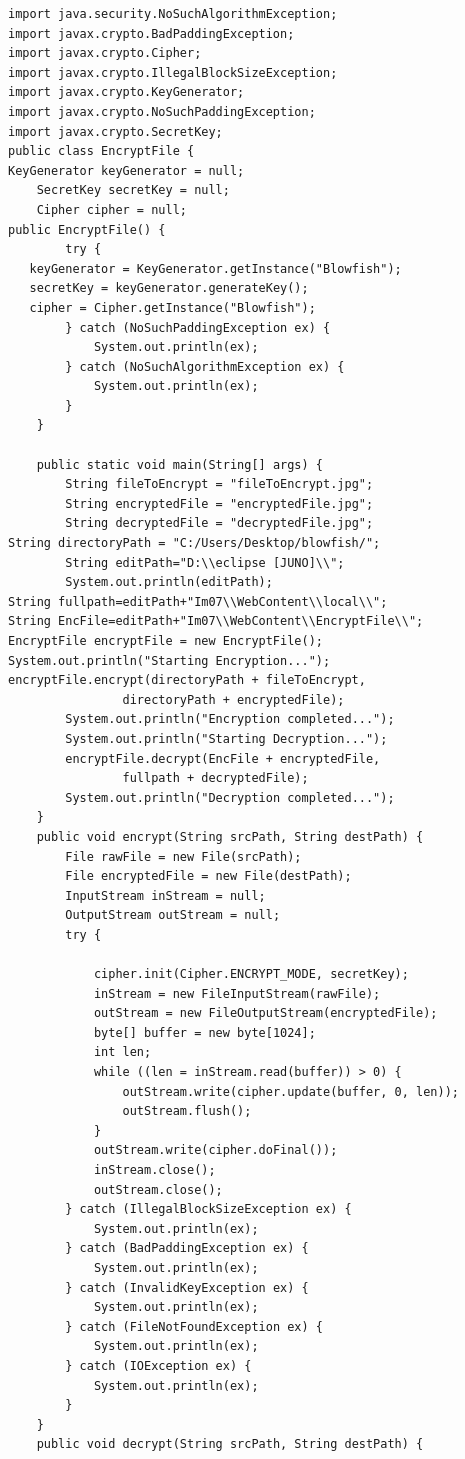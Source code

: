 \documentclass[BTech]{srmuthesis}
\begin{document}
\begin{verbatim}
import java.security.NoSuchAlgorithmException;
import javax.crypto.BadPaddingException;
import javax.crypto.Cipher;
import javax.crypto.IllegalBlockSizeException;
import javax.crypto.KeyGenerator;
import javax.crypto.NoSuchPaddingException;
import javax.crypto.SecretKey;
public class EncryptFile {
KeyGenerator keyGenerator = null;
    SecretKey secretKey = null;
    Cipher cipher = null;
public EncryptFile() {
        try {
   keyGenerator = KeyGenerator.getInstance("Blowfish");
   secretKey = keyGenerator.generateKey();
   cipher = Cipher.getInstance("Blowfish");
        } catch (NoSuchPaddingException ex) {
            System.out.println(ex);
        } catch (NoSuchAlgorithmException ex) {
            System.out.println(ex);
        }
    }

    public static void main(String[] args) {
        String fileToEncrypt = "fileToEncrypt.jpg";
        String encryptedFile = "encryptedFile.jpg";
        String decryptedFile = "decryptedFile.jpg";
String directoryPath = "C:/Users/Desktop/blowfish/";
        String editPath="D:\\eclipse [JUNO]\\";
		System.out.println(editPath);
String fullpath=editPath+"Im07\\WebContent\\local\\";
String EncFile=editPath+"Im07\\WebContent\\EncryptFile\\";
EncryptFile encryptFile = new EncryptFile();
System.out.println("Starting Encryption...");
encryptFile.encrypt(directoryPath + fileToEncrypt,
                directoryPath + encryptedFile);
        System.out.println("Encryption completed...");
        System.out.println("Starting Decryption...");
        encryptFile.decrypt(EncFile + encryptedFile,
        		fullpath + decryptedFile);
        System.out.println("Decryption completed...");
    }
    public void encrypt(String srcPath, String destPath) {
        File rawFile = new File(srcPath);
        File encryptedFile = new File(destPath);
        InputStream inStream = null;
        OutputStream outStream = null;
        try {
           
            cipher.init(Cipher.ENCRYPT_MODE, secretKey);
            inStream = new FileInputStream(rawFile);
            outStream = new FileOutputStream(encryptedFile);
            byte[] buffer = new byte[1024];
            int len;
            while ((len = inStream.read(buffer)) > 0) {
                outStream.write(cipher.update(buffer, 0, len));
                outStream.flush();
            }
            outStream.write(cipher.doFinal());
            inStream.close();
            outStream.close();
        } catch (IllegalBlockSizeException ex) {
            System.out.println(ex);
        } catch (BadPaddingException ex) {
            System.out.println(ex);
        } catch (InvalidKeyException ex) {
            System.out.println(ex);
        } catch (FileNotFoundException ex) {
            System.out.println(ex);
        } catch (IOException ex) {
            System.out.println(ex);
        }
    }
    public void decrypt(String srcPath, String destPath) {
    	


\end{verbatim}
\end{document}
